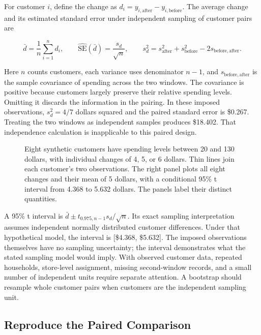 For customer \(i\), define the change as
\(d_i=y_{i,\mathrm{after}}-y_{i,\mathrm{before}}\). The average change
and its estimated standard error under independent sampling of customer
pairs are

\[
\bar d=\frac{1}{n}\sum_{i=1}^{n}d_i,
\qquad
\widehat{\mathrm{SE}}(\bar d)=\frac{s_d}{\sqrt n},
\qquad
s_d^2=s_{\mathrm{after}}^2+s_{\mathrm{before}}^2-2s_{\mathrm{before,after}}.
\]

Here \(n\) counts customers, each variance uses denominator \(n-1\), and
\(s_{\mathrm{before,after}}\) is the sample covariance of spending
across the two windows. The covariance is positive because customers
largely preserve their relative spending levels. Omitting it discards
the information in the pairing. In these imposed observations,
\(s_d^2=4/7\) dollars squared and the paired standard error is \$0.267.
Treating the two windows as independent samples produces \$18.402. That
independence calculation is inapplicable to this paired design.

\begin{figure}[htbp]
\centering

\caption{Eight synthetic customers have spending levels between 20 and 130 dollars, with individual changes of 4, 5, or 6 dollars. Thin lines join each customer’s two observations. The right panel plots all eight changes and their mean of 5 dollars, with a conditional 95\% t interval from 4.368 to 5.632 dollars. The panels label their distinct quantities.}\label{fig:M02_paired_spending}
\end{figure}

A 95\% t interval is \(\bar d\pm t_{0.975,n-1}s_d/\sqrt n\). Its exact
sampling interpretation assumes independent normally distributed
customer differences. Under that hypothetical model, the interval is
{[}\$4.368, \$5.632{]}. The imposed observations themselves have no
sampling uncertainty; the interval demonstrates what the stated sampling
model would imply. With observed customer data, repeated households,
store-level assignment, missing second-window records, and a small
number of independent units require separate attention. A bootstrap
should resample whole customer pairs when customers are the independent
sampling unit.

\hypertarget{M02-reproduce-the-paired-comparison}{%
\subsection{Reproduce the Paired
Comparison}\label{M02-reproduce-the-paired-comparison}}

